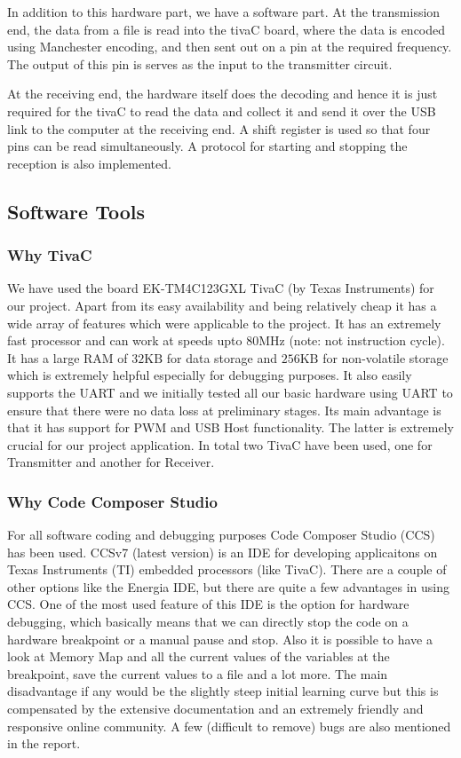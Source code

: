 \documentclass{article}
\begin{document}
In addition to this hardware part,  we have a software part. At the transmission end, the data from a file is read into the tivaC board, where the data is encoded using Manchester encoding, and then sent out on a pin at the required frequency. The output of this pin is serves as the input to the transmitter circuit.

At the receiving end, the hardware itself does the decoding and hence it is just required for the tivaC to read the data and collect it and send it over the USB link to the computer at the receiving end. A shift register is used so that four pins can be read simultaneously. A protocol for starting and stopping the reception is also implemented. %

\subsection{Software Tools}
\subsubsection{Why TivaC}
We have used the board EK-TM4C123GXL TivaC (by Texas Instruments) for our project. Apart from its easy availability and being relatively cheap it has a wide array of features which were applicable to the project. It has an extremely fast processor and can work at speeds upto 80MHz (note: not instruction cycle). It has a large RAM of $32\text{KB}$ for data storage and $256\text{KB}$ for non-volatile storage which is extremely helpful especially for debugging purposes. It also easily supports the UART and we initially tested all our basic hardware using UART to ensure that there were no data loss at preliminary stages. Its main advantage is that it has support for PWM and USB Host functionality. The latter is extremely crucial for our project application. In total two TivaC have been used, one for Transmitter and another for Receiver.

\subsubsection{Why Code Composer Studio}
For all software coding and debugging purposes Code Composer Studio (CCS) has been used. CCSv7 (latest version) is an IDE for developing applicaitons on Texas Instruments (TI) embedded processors (like TivaC). There are a couple of other options like the Energia IDE, but there are quite a few advantages in using CCS. One of the most used feature of this IDE is the option for hardware debugging, which basically means that we can directly stop the code on a hardware breakpoint or a manual pause and stop. Also it is possible to have a look at Memory Map and all the current values of the variables at the breakpoint, save the current values to a file and a lot more. The main disadvantage if any would be the slightly steep initial learning curve but this is compensated by the extensive documentation and an extremely friendly and responsive online community. A few (difficult to remove) bugs are also mentioned in the report. 
\end{document}
